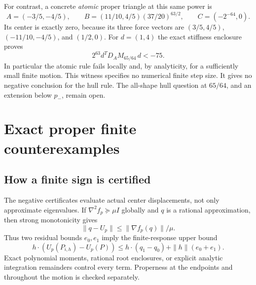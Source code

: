 \documentclass[11pt]{article}
\theoremstyle{definition}
\newcommand{\pn}{p_{-}}
\begin{document}
For contrast, a concrete \emph{atomic} proper triangle at this same power is
\[
 A=(-3/5,-4/5),\qquad
 B=(11/10,4/5)(37/20)^{63/2},\qquad C=(-2^{-64},0).
\]
Its center is exactly zero, because its three force vectors are
$(3/5,4/5)$, $(-11/10,-4/5)$, and $(1/2,0)$. For $d=(1,4)$ the exact
stiffness enclosure proves
\[
 2^{63}d^TD_A M_{65/64}\,d<-75.
\]
In particular the atomic rule fails locally and, by analyticity, for a
sufficiently small finite motion. This witness specifies no numerical
finite step size. It gives no negative conclusion for the hull rule.
The all-shape hull question at $65/64$, and an extension below $\pn$,
remain open.

\section{Exact proper finite counterexamples}
\subsection{How a finite sign is certified}
The negative certificates evaluate actual center displacements, not only
approximate eigenvalues. If $\nabla^2f_p\succeq\mu I$ globally and $q$ is
a rational approximation, then strong monotonicity gives
\begin{equation}\label{eq:residual}
 \|q-U_p\|\le\|\nabla f_p(q)\|/\mu.
\end{equation}
Thus two residual bounds $e_0,e_1$ imply the finite-response upper bound
\[
 h\cdot(U_p(P_{i,h})-U_p(P))
 \le h\cdot(q_1-q_0)+\|h\|(e_0+e_1).
\]
Exact polynomial moments, rational root enclosures, or explicit analytic
integration remainders control every term. Properness at the endpoints
and throughout the motion is checked separately.
\end{document}

